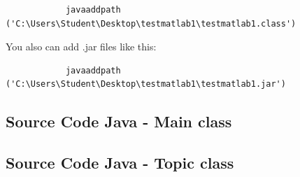 \documentclass[12pt]{article}
\begin{document}
\begin{itemize}
\begin{itemize}
		\begin{center}
			\begin{verbatim}
			javaaddpath ('C:\Users\Student\Desktop\testmatlab1\testmatlab1.class') 
			\end{verbatim}
		\end{center}
		You also can add .jar files like this:
		\begin{center}
			\begin{verbatim}
			javaaddpath ('C:\Users\Student\Desktop\testmatlab1\testmatlab1.jar')
			\end{verbatim}
		\end{center}
		
		
		
	\end{itemize}
\end{itemize}

\subsection{Source Code Java - Main class}\label{sec:source-code-gui}
\lstset{language=Java} 
\lstset{basicstyle=\small}
 
\newpage
\subsection{Source Code Java - Topic class}
\lstset{language=Java} 
\lstset{basicstyle=\small}
 
\end{document}

